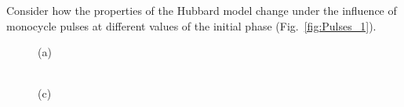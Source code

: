 \FloatBarrier


Consider how the properties of the Hubbard model change under the influence of monocycle pulses at different values of the initial phase (Fig.~\ref{fig:Pulses_1}).
\begin{figure}[h!]
\begin{minipage}[h]{0.5\linewidth}
 (a) \\
\end{minipage}
\hfill
\begin{minipage}[h]{0.5\linewidth}
 \\(c)

\end{minipage}
\end{figure}
